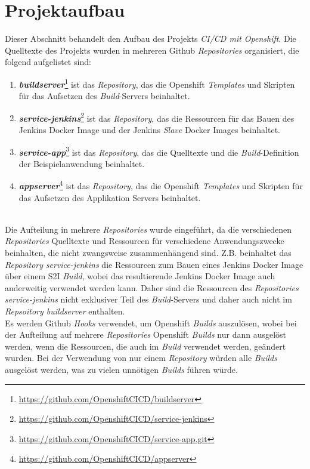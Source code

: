 \section{Projektaufbau}
\label{sec:project-setup}
Dieser Abschnitt behandelt den Aufbau des Projekts \emph{CI/CD mit Openshift}. Die Quelltexte des Projekts wurden in mehreren Github \emph{Repositories} organisiert, die folgend aufgelistet sind:
\begin{enumerate}
	\item\textbf{\emph{buildserver}}\footnote{\url{https://github.com/OpenshiftCICD/buildserver}} ist das \emph{Repository}, das die Openshift \emph{Templates} und Skripten für das Aufsetzen des \emph{Build}-Servers beinhaltet.
	\item\textbf{\emph{service-jenkins}}\footnote{\url{https://github.com/OpenshiftCICD/service-jenkins}} ist das \emph{Repository}, das die Ressourcen für das Bauen des Jenkins Docker Image und der Jenkins \emph{Slave} Docker Images beinhaltet.
	\item\textbf{\emph{service-app}}\footnote{\url{https://github.com/OpenshiftCICD/service-app.git}} ist das \emph{Repository}, das die Quelltexte und die \emph{Build}-Definition der Beispielanwendung beinhaltet.
	\item\textbf{\emph{appserver}}\footnote{\url{https://github.com/OpenshiftCICD/appserver}} ist das \emph{Repository}, das die Openshift \emph{Templates} und Skripten für das Aufsetzen des Applikation Servers beinhaltet.
\end{enumerate}
\ \\
Die Aufteilung in mehrere \emph{Repositories} wurde eingeführt, da die verschiedenen \emph{Repositories} Quelltexte und Ressourcen für verschiedene Anwendungszwecke beinhalten, die nicht zwangsweise zusammenhängend sind. Z.B. beinhaltet das \emph{Repository} \emph{service-jenkins} die Ressourcen zum Bauen eines Jenkins Docker Image über einem S2I \emph{Build}, wobei das resultierende Jenkins Docker Image auch anderweitig verwendet werden kann. Daher sind die Ressourcen des \emph{Repositories service-jenkins} nicht exklusiver Teil des \emph{Build}-Servers und daher auch nicht im \emph{Repsoitory buildserver} enthalten. \\

Es werden Github \emph{Hooks} verwendet, um Openshift \emph{Builds} auszulösen, wobei bei der Aufteilung auf mehrere \emph{Repositories} Openshift \emph{Builds} nur dann ausgelöst werden, wenn die Ressourcen, die auch im \emph{Build} verwendet werden, geändert wurden. Bei der Verwendung von nur einem \emph{Repository} würden alle \emph{Builds} ausgelöst werden, was zu vielen unnötigen \emph{Builds} führen würde.